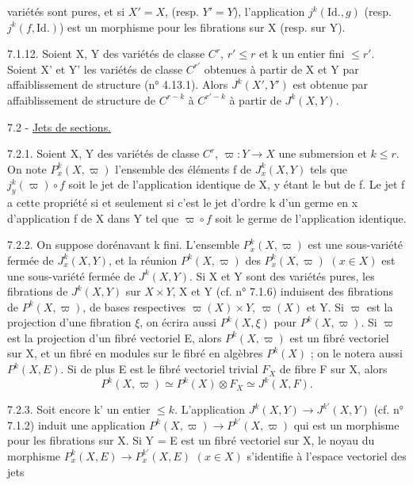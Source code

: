 
variétés sont pures, et si $X'=X$, (resp. $Y'=Y$), l'application $j^k(\mathrm{Id}.,g)$ (resp. $j^k(f,\mathrm{Id}.)$) est un morphisme pour les fibrations sur X (resp. sur Y).

7.1.12. Soient X, Y des variétés de classe $C^r$, $r'\leq r$ et k un entier fini $\leq r'$. Soient X' et Y' les variétés de classe $C^{r'}$ obtenues à partir de X et Y par affaiblissement de structure (n° 4.13.1). Alors $J^k(X',Y')$ est obtenue par affaiblissement de structure de $C^{r-k}$ à $C^{r'-k}$ à partir de $J^k(X,Y)$.

7.2 - \uline{Jets de sections.}

7.2.1. Soient X, Y des variétés de classe $C^r$, $\varpi:Y\longrightarrow X$ une submersion et $k\leq r$. On note $P_x^k(X,\varpi)$ l'ensemble des éléments f de $J_x^k(X,Y)$ tels que $j_y^k(\varpi)\circ f$ soit le jet de l'application identique de X, y étant le but de f. Le jet f a cette propriété si et seulement si c'est le jet d'ordre k d'un germe en x d'application f de X dans Y tel que $\varpi\circ f$ soit le germe de l'application identique.

7.2.2. On suppose dorénavant k fini. L'ensemble $P_x^k(X,\varpi)$ est une sous-variété fermée de $J_x^k(X,Y)$, et la réunion $P^k(X,\varpi)$ des $P_x^k(X,\varpi)$ $(x\in X)$ est une sous-variété fermée de $J^k(X,Y)$. Si X et Y sont des variétés pures, les fibrations de $J^k(X,Y)$ sur $X\times Y$, X et Y (cf. n° 7.1.6) induisent des fibrations de $P^k(X,\varpi)$, de bases respectives $\varpi(X)\times Y$, $\varpi(X)$ et Y. Si $\varpi$ est la projection d'une fibration $\xi$, on écrira aussi $P^k(X,\xi)$ pour $P^k(X,\varpi)$. Si $\varpi$ est la projection d'un fibré vectoriel E, alors $P^k(X,\varpi)$ est un fibré vectoriel sur X, et un fibré en modules sur le fibré en algèbres $P^k(X)$ ; on le notera aussi $P^k(X,E)$. Si de plus E est le fibré vectoriel trivial $F_X$ de fibre F sur X, alors
\[
P^k(X,\varpi)\simeq P^k(X)\otimes F_X\simeq J^k(X,F).
\]

7.2.3. Soit encore k' un entier $\leq k$. L'application $J^k(X,Y)\longrightarrow J^{k'}(X,Y)$ (cf. n° 7.1.2) induit une application $P^k(X,\varpi)\longrightarrow P^{k'}(X,\varpi)$ qui est un morphisme pour les fibrations sur X. Si Y = E est un fibré vectoriel sur X, le noyau du morphisme $P_x^k(X,E)\longrightarrow P_x^{k'}(X,E)$ $(x\in X)$ s'identifie à l'espace vectoriel des jets
